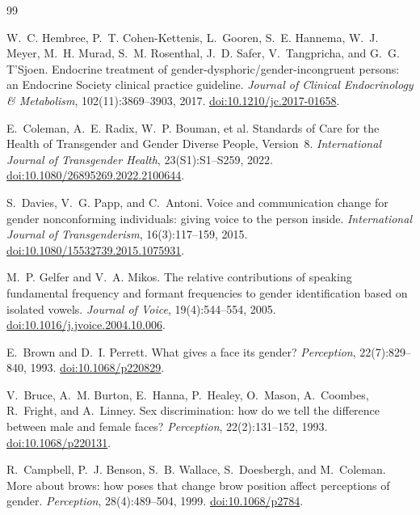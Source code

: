 \documentclass[11pt,a4paper]{article}
\theoremstyle{remark}
\begin{document}
\begin{thebibliography}{99}
\setlength{\itemsep}{2pt}

W.~C. Hembree, P.~T. Cohen-Kettenis, L.~Gooren, S.~E. Hannema, W.~J. Meyer, M.~H. Murad, S.~M. Rosenthal, J.~D. Safer, V.~Tangpricha, and G.~G. T'Sjoen.
Endocrine treatment of gender-dysphoric/gender-incongruent persons: an Endocrine Society clinical practice guideline.
\emph{Journal of Clinical Endocrinology \& Metabolism}, 102(11):3869--3903, 2017.
\href{https://doi.org/10.1210/jc.2017-01658}{doi:10.1210/jc.2017-01658}.

E.~Coleman, A.~E. Radix, W.~P. Bouman, et al.
Standards of Care for the Health of Transgender and Gender Diverse People, Version~8.
\emph{International Journal of Transgender Health}, 23(S1):S1--S259, 2022.
\href{https://doi.org/10.1080/26895269.2022.2100644}{doi:10.1080/26895269.2022.2100644}.

S.~Davies, V.~G. Papp, and C.~Antoni.
Voice and communication change for gender nonconforming individuals: giving voice to the person inside.
\emph{International Journal of Transgenderism}, 16(3):117--159, 2015.
\href{https://doi.org/10.1080/15532739.2015.1075931}{doi:10.1080/15532739.2015.1075931}.

M.~P. Gelfer and V.~A. Mikos.
The relative contributions of speaking fundamental frequency and formant frequencies to gender identification based on isolated vowels.
\emph{Journal of Voice}, 19(4):544--554, 2005.
\href{https://doi.org/10.1016/j.jvoice.2004.10.006}{doi:10.1016/j.jvoice.2004.10.006}.

E.~Brown and D.~I. Perrett.
What gives a face its gender?
\emph{Perception}, 22(7):829--840, 1993.
\href{https://doi.org/10.1068/p220829}{doi:10.1068/p220829}.

V.~Bruce, A.~M. Burton, E.~Hanna, P.~Healey, O.~Mason, A.~Coombes, R.~Fright, and A.~Linney.
Sex discrimination: how do we tell the difference between male and female faces?
\emph{Perception}, 22(2):131--152, 1993.
\href{https://doi.org/10.1068/p220131}{doi:10.1068/p220131}.

R.~Campbell, P.~J. Benson, S.~B. Wallace, S.~Doesbergh, and M.~Coleman.
More about brows: how poses that change brow position affect perceptions of gender.
\emph{Perception}, 28(4):489--504, 1999.
\href{https://doi.org/10.1068/p2784}{doi:10.1068/p2784}.


\end{thebibliography}
\end{document}
